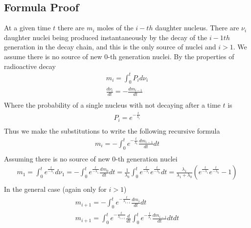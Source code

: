 \documentclass[12pt]{article}
\begin{document}
\subsection{Formula Proof}
At a given time $t$ there are $m_i$ moles of the $i-th$ daughter nucleus. There are $\nu_{i}$ daughter nuclei being produced instantaneously by the decay of the $i-1th$ generation in the decay chain, and this is the only source of nuclei and $i>1$. We assume there is no source of new 0-th generation nuclei. By the properties of radioactive decay
\begin{equation}\label{eqn:propertiesRad}
\begin{split}
m_i = \int_0^t P_id\nu_{i}\\
\frac{d\nu_{i}}{dt} = -\frac{dm_{i-1}}{dt}\\
\end{split}
\end{equation}
Where the probability of a single nucleus with not decaying after a time $t$ is
\begin{equation}
\begin{split}
P_i = e^{-\frac{t}{\lambda_{i}}}\\
\end{split}
\end{equation}
Thus we make the substitutions to write the following recursive formula
\begin{equation}\label{eqn:recursiveForm}
\begin{split}
m_i = -\int_0^t e^{-\frac{t}{\lambda_{i}}}\frac{dm_{i-1}}{dt}dt\\
\end{split}
\end{equation}
Assuming there is no source of new 0-th generation nuclei
\begin{equation}
\begin{split}
m_1 = \int_0^te^{\frac{t}{-\lambda_1}}d\nu_1 = -\int_0^te^{\frac{t}{-\lambda_1}}\frac{dm_0}{dt}dt = \frac{1}{\lambda_0}\int_0^te^{\frac{t}{-\lambda_1}}e^{\frac{t}{-\lambda_0}}dt = \frac{\lambda_1}{\lambda_1+\lambda_0}(e^{\frac{t}{-\lambda_1}}e^{\frac{t}{-\lambda_0}}-1) \\
\end{split}
\end{equation}
In the general case (again only for $i>1$)
\begin{equation}
\begin{split}
m_{i+1} = -\int_0^t e^{-\frac{t}{\lambda_{i+1}}}\frac{dm_{i}}{dt}dt\\
m_{i+1} = \int_0^t e^{-\frac{t}{\lambda_{i+1}}}\frac{d}{dt}\int_0^t e^{-\frac{t}{\lambda_{i}}}\frac{dm_{i-1}}{dt}dtdt\\
\end{split}
\end{equation}
\end{document}
